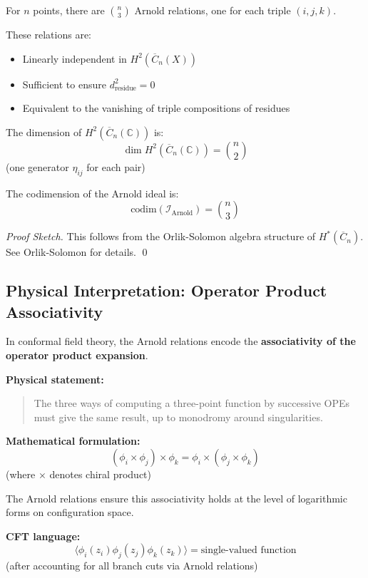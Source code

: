 \begin{theorem}\label{thm:arnold-general-n}
For $n$ points, there are $\binom{n}{3}$ Arnold relations, one for each triple $(i,j,k)$.

These relations are:
\begin{itemize}
\item Linearly independent in $H^2(\overline{C}_n(X))$
\item Sufficient to ensure $d_{\text{residue}}^2 = 0$
\item Equivalent to the vanishing of triple compositions of residues
\end{itemize}

The dimension of $H^2(\overline{C}_n(\mathbb{C}))$ is:
$$\dim H^2(\overline{C}_n(\mathbb{C})) = \binom{n}{2}$$
(one generator $\eta_{ij}$ for each pair)

The codimension of the Arnold ideal is:
$$\text{codim}(\mathcal{I}_{\text{Arnold}}) = \binom{n}{3}$$
\end{theorem}

\begin{proof}[Proof Sketch]
This follows from the Orlik-Solomon algebra structure of $H^*(\overline{C}_n)$.
See Orlik-Solomon \cite{OS80} for details.
\qed
\end{proof}

\subsection{Physical Interpretation: Operator Product Associativity}

\begin{perspective}[OPE Associativity = Arnold Relations]\label{persp:ope-arnold}
In conformal field theory, the Arnold relations encode the \textbf{associativity of the
operator product expansion}.

\textbf{Physical statement:}
\begin{quotation}
The three ways of computing a three-point function by successive OPEs must give the same
result, up to monodromy around singularities.
\end{quotation}

\textbf{Mathematical formulation:}
$$(\phi_i \times \phi_j) \times \phi_k = \phi_i \times (\phi_j \times \phi_k)$$
(where $\times$ denotes chiral product)

The Arnold relations ensure this associativity holds at the level of logarithmic forms on
configuration space.

\textbf{CFT language:}
$$\langle \phi_i(z_i) \phi_j(z_j) \phi_k(z_k) \rangle = \text{single-valued function}$$
(after accounting for all branch cuts via Arnold relations)
\end{perspective}

